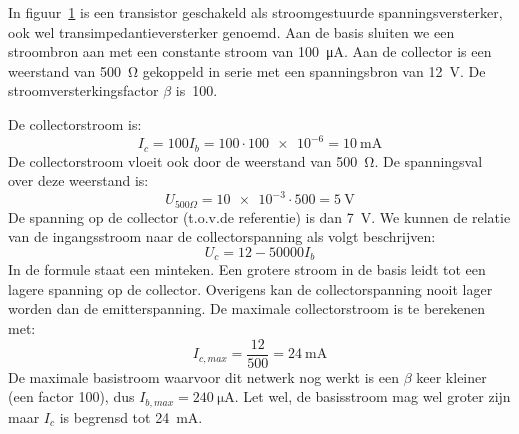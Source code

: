 \begin{example}
In figuur~\ref{fig:gelnpntransistor2} is een transistor geschakeld als stroomgestuurde spanningsversterker, ook wel transimpedantieversterker genoemd. Aan de basis sluiten we een stroombron aan met een constante stroom van \SI{100}{\micro\ampere}. Aan de collector is een weerstand van \SI{500}{\ohm} gekoppeld in serie met een spanningsbron van \SI{12}{\volt}. De stroomversterkingsfactor $\beta$ is~100.

\begin{figure}[H]
\centering
{}
\label{fig:gelnpntransistor2}
\end{figure}

De collectorstroom is:
%
\begin{equation}
I_c = 100I_b = \num{100}\cdot\num{100e-6} = \SI{10}{\milli\ampere}
\end{equation}
%
De collectorstroom vloeit ook door de weerstand van \SI{500}{\ohm}. De spanningsval over deze weerstand is:
%
\begin{equation}
U_{500\Omega} = \SI{10e-3}\cdot{500} = \SI{5}{\volt}
\end{equation}
%
De spanning op de collector (t.o.v.\@ de referentie) is dan \SI{7}{\volt}. We kunnen de relatie van de ingangsstroom naar de collectorspanning als volgt beschrijven:
%
\begin{equation}
U_c = 12 - \num{50000}I_b
\end{equation}
%
In de formule staat een minteken. Een grotere stroom in de basis leidt tot een lagere spanning op de collector. Overigens kan de collectorspanning nooit lager worden dan de emitterspanning. De maximale collectorstroom is te berekenen met:
%
\begin{equation}
I_{c,max} = \dfrac{12}{500} = \SI{24}{\milli\ampere}
\end{equation}
%
De maximale basistroom waarvoor dit netwerk nog werkt is een $\beta$ keer kleiner (een factor 100), dus $I_{b,max}=\SI{240}{\micro\ampere}$. Let wel, de basisstroom mag wel groter zijn maar $I_c$ is begrensd tot \SI{24}{\milli\ampere}.


\end{example}
